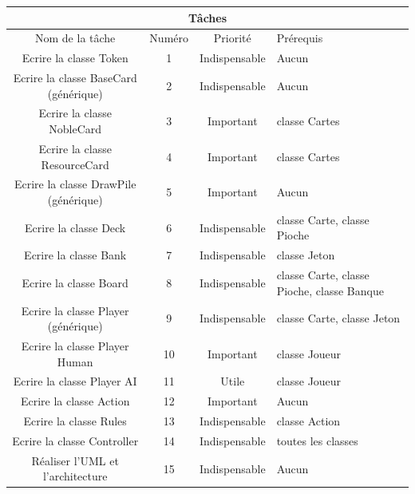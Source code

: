 \documentclass[12pt, letterpaper]{article}
\begin{document}
\begin{center}
\begin{tabular}{ |c||c||c|p{5cm}| }
\hline
\multicolumn{4}{|c|}{Tâches} \\
\hline
Nom de la tâche & Numéro & Priorité & Prérequis\\
\hline
\hline
Ecrire la classe Token & 1 & \cellcolor[HTML]{ee7d7d} Indispensable & Aucun\\
\hline
Ecrire la classe BaseCard (générique) & 2 & \cellcolor[HTML]{ee7d7d} Indispensable & Aucun\\
\hline
Ecrire la classe NobleCard & 3 & \cellcolor[HTML]{eeda7d} Important & classe Cartes\\
\hline
Ecrire la classe ResourceCard & 4 & \cellcolor[HTML]{eeda7d} Important & classe Cartes\\
\hline
Ecrire la classe DrawPile (générique) & 5 & \cellcolor[HTML]{eeda7d} Important & Aucun\\
\hline
Ecrire la classe Deck &  6 & \cellcolor[HTML]{ee7d7d} Indispensable & classe Carte, classe Pioche\\
\hline
Ecrire la classe Bank & 7 & \cellcolor[HTML]{ee7d7d} Indispensable & classe Jeton\\
\hline
Ecrire la classe Board & 8 & \cellcolor[HTML]{ee7d7d} Indispensable & classe Carte, classe Pioche, classe Banque\\
\hline
Ecrire la classe Player (générique) & 9 & \cellcolor[HTML]{ee7d7d} Indispensable & classe Carte, classe Jeton\\
\hline
Ecrire la classe Player Human & 10 & \cellcolor[HTML]{eeda7d} Important & classe Joueur\\
\hline
Ecrire la classe Player AI & 11 & \cellcolor[HTML]{a5ee7d} Utile & classe Joueur\\
\hline
Ecrire la classe Action & 12 & \cellcolor[HTML]{eeda7d} Important & Aucun\\
\hline
Ecrire la classe Rules & 13 & \cellcolor[HTML]{ee7d7d} Indispensable & classe Action\\
\hline
Ecrire la classe Controller & 14 & \cellcolor[HTML]{ee7d7d} Indispensable & toutes les classes\\
\hline
Réaliser l'UML et l'architecture & 15 & \cellcolor[HTML]{ee7d7d} Indispensable & Aucun\\
\hline
\end{tabular}
\end{center}
\end{document}
